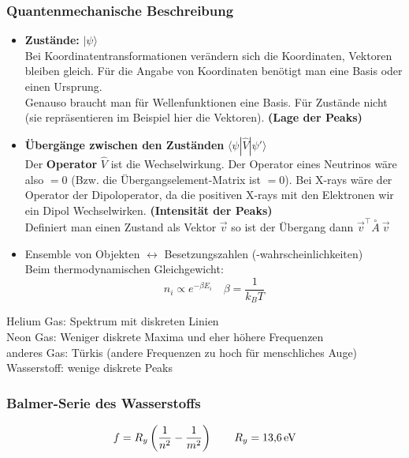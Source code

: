 \subsubsection{Quantenmechanische Beschreibung}

\begin{itemize}
	\item \textbf{Zustände:} $ |\psi \rangle $\\
	Bei Koordinatentransformationen verändern sich die Koordinaten, Vektoren bleiben gleich. Für die Angabe von Koordinaten benötigt man eine Basis oder einen Ursprung.\\
	Genauso braucht man für Wellenfunktionen eine Basis. Für Zustände nicht (sie repräsentieren im Beispiel hier die Vektoren). \textbf{(Lage der Peaks)}
	\item \textbf{Übergänge zwischen den Zuständen} $ \langle \psi | \hat{V} | \psi'\rangle $\\
	Der \textbf{Operator} $ \hat{V} $ ist die Wechselwirkung. Der Operator eines Neutrinos wäre also $ = 0 $ (Bzw. die Übergangselement-Matrix ist $ = 0 $). Bei X-rays wäre der Operator der Dipoloperator, da die positiven X-rays mit den Elektronen wir ein Dipol Wechselwirken. \textbf{(Intensität der Peaks)}\\
	Definiert man einen Zustand als Vektor $ \vec{v} $ so ist der Übergang dann $ \vec{v}^\top \overset{\circ}{A}\ \vec{v} $
	\item Ensemble von Objekten $ \leftrightarrow $ Besetzungszahlen (-wahrscheinlichkeiten) \\
	Beim thermodynamischen Gleichgewicht:
	\begin{equation*}
	n_i \propto e^{- \beta E_i} \quad \beta = \frac{1}{k_B T}
	\end{equation*}
\end{itemize}
Helium Gas: Spektrum mit diskreten Linien\\
Neon Gas: Weniger diskrete Maxima und eher höhere Frequenzen\\
anderes Gas: Türkis (andere Frequenzen zu hoch für menschliches Auge)\\
Wasserstoff: wenige diskrete Peaks

\subsubsection{Balmer-Serie des Wasserstoffs}

\begin{equation*}
f = R_y\left(\frac{1}{n^2} - \frac{1}{m^2}\right) \qquad R_y = 13{,}6 \, \textrm{eV}
\end{equation*}

